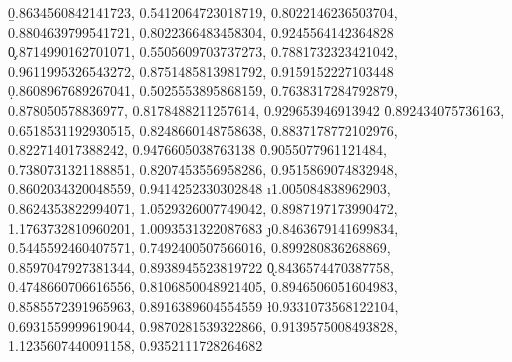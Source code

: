 \readlist*{} %
\readlist*\b{0.8634560842141723, 0.5412064723018719, 0.8022146236503704, 0.8804639799541721, 0.8022366483458304, 0.9245564142364828} %
\readlist*\c{0.8714990162701071, 0.5505609703737273, 0.7881732323421042, 0.9611995326543272, 0.8751485813981792, 0.9159152227103448} %
\readlist*\d{0.8608967689267041, 0.5025553895868159, 0.7638317284792879, 0.878050578836977, 0.8178488211257614, 0.929653946913942} %
\readlist*{} %
\readlist*\f{0.892434075736163, 0.6518531192930515, 0.8248660148758638, 0.8837178772102976, 0.822714017388242, 0.9476605038763138} %
\readlist*{} %
\readlist*\h{0.9055077961121484, 0.7380731321188851, 0.8207453556958286, 0.9515869074832948, 0.8602034320048559, 0.9414252330302848} %
\readlist*\i{1.005084838962903, 0.8624353822994071, 1.0529326007749042, 0.8987197173990472, 1.1763732810960201, 1.0093531322087683} %
\readlist*\j{0.8463679141699834, 0.5445592460407571, 0.7492400507566016, 0.899280836268869, 0.8597047927381344, 0.8938945523819722} %
\readlist*\k{0.8436574470387758, 0.4748660706616556, 0.8106850048921405, 0.8946506051604983, 0.8585572391965963, 0.8916389604554559} %
\readlist*\l{0.9331073568122104, 0.6931559999619044, 0.9870281539322866, 0.9139575008493828, 1.1235607440091158, 0.9352111728264682} %


\readlist*{} 
\readlist*{} 
\readlist*{}

\newcommand{\lrv}{\num{3e-5}}

